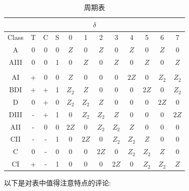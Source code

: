 \documentclass{article}
\numberwithin{equation}{subsection}
\begin{document}
\begin{table}[h]
    \centering
    \begin{tabular}{|c|c|c|c|c|c|c|c|c|c|c|c|}
    \hline
    \multicolumn{12}{|c|}{$\delta$}                                                   \\ \hline
    Class & T & C & S & 0     & 1     & 2     & 3     & 4     & 5     & 6     & 7     \\ \hline
    A     & 0 & 0 & 0 & $Z$   & 0     & $Z$   & 0     & $Z$   & 0     & $Z$   & 0     \\ \hline
    AIII  & 0 & 0 & 1 & 0     & $Z$   & 0     & $Z$   & 0     & $Z$   & 0     & $Z$   \\ \hline
    \\ \hline
    AI    & + & 0 & 0 & $Z$   & 0     & 0     & 0     & $2Z$  & 0     & $Z_2$ & $Z_2$ \\ \hline
    BDI   & + & + & 1 & $Z_2$ & $Z$   & 0     & 0     & 0     & $2Z$  & 0     & $Z_2$ \\ \hline
    D     & 0 & + & 0 & $Z_2$ & $Z_2$ & $Z$   & 0     & 0     & 0     & $2Z$  & 0     \\ \hline
    DIII  & - & + & 1 & 0     & $Z_2$ & $Z_2$ & $Z$   & 0     & 0     & 0     & $2Z$  \\ \hline
    AII   & - & 0 & 0 & $2Z$  & 0     & $Z_2$ & $Z_2$ & $Z$   & 0     & 0     & 0     \\ \hline
    CII   & - & - & 1 & 0     & $2Z$  & 0     & $Z_2$ & $Z_2$ & $Z$   & 0     & 0     \\ \hline
    C     & 0 & - & 0 & 0     & 0     & $2Z$  & 0     & $Z_2$ & $Z_2$ & $Z$   & 0     \\ \hline
    CI    & + & - & 1 & 0     & 0     & 0     & $2Z$  & 0     & $Z_2$ & $Z_2$ & $Z$   \\ \hline
    \end{tabular}
    \caption{周期表}
\end{table}
以下是对表中值得注意特点的评论:
\end{document}
